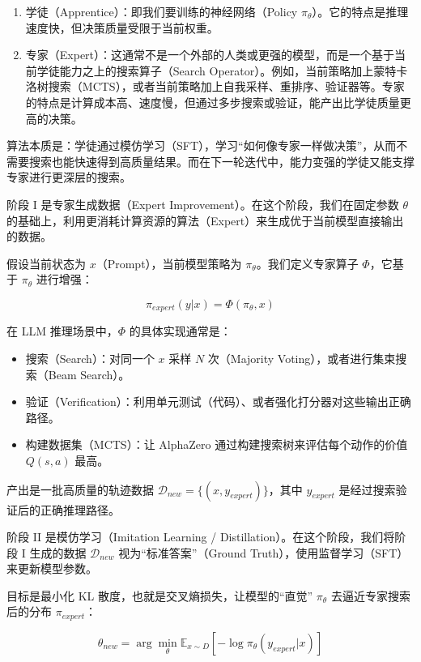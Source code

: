 \begin{enumerate}
\def\labelenumi{\arabic{enumi}.}
\tightlist
\item
  学徒（Apprentice）：即我们要训练的神经网络（Policy \(\pi_\theta\)）。它的特点是推理速度快，但决策质量受限于当前权重。
\item
  专家（Expert）：这通常不是一个外部的人类或更强的模型，而是一个基于当前学徒能力之上的搜索算子（Search Operator）。例如，当前策略加上蒙特卡洛树搜索（MCTS），或者当前策略加上自我采样、重排序、验证器等。专家的特点是计算成本高、速度慢，但通过多步搜索或验证，能产出比学徒质量更高的决策。
\end{enumerate}

算法本质是：学徒通过模仿学习（SFT），学习``如何像专家一样做决策''，从而不需要搜索也能快速得到高质量结果。而在下一轮迭代中，能力变强的学徒又能支撑专家进行更深层的搜索。

阶段 I 是专家生成数据（Expert Improvement）。在这个阶段，我们在固定参数 \(\theta\) 的基础上，利用更消耗计算资源的算法（Expert）来生成优于当前模型直接输出的数据。

假设当前状态为 \(x\)（Prompt），当前模型策略为 \(\pi_\theta\)。我们定义专家算子 \(\Phi\)，它基于 \(\pi_\theta\) 进行增强：

\[
\pi_{expert}(y|x)=\Phi(\pi_\theta,x)
\]

在 LLM 推理场景中，\(\Phi\) 的具体实现通常是：

\begin{itemize}
\tightlist
\item
  搜索（Search）：对同一个 \(x\) 采样 \(N\) 次（Majority Voting），或者进行集束搜索（Beam Search）。
\item
  验证（Verification）：利用单元测试（代码）、或者强化打分器对这些输出正确路径。
\item
  构建数据集（MCTS）：让 AlphaZero 通过构建搜索树来评估每个动作的价值 \(Q(s,a)\) 最高。
\end{itemize}

产出是一批高质量的轨迹数据 \(\mathcal{D}_{new}=\{(x,y_{expert})\}\)，其中 \(y_{expert}\) 是经过搜索验证后的正确推理路径。

阶段 II 是模仿学习（Imitation Learning / Distillation）。在这个阶段，我们将阶段 I 生成的数据 \(\mathcal{D}_{new}\) 视为``标准答案''（Ground Truth），使用监督学习（SFT）来更新模型参数。

目标是最小化 KL 散度，也就是交叉熵损失，让模型的``直觉'' \(\pi_\theta\) 去逼近专家搜索后的分布 \(\pi_{expert}\)：

\[
\theta_{new}=\arg\min_\theta \mathbb{E}_{x\sim D}\left[-\log\pi_\theta(y_{expert}|x)\right]
\]

